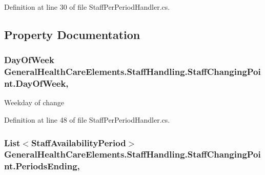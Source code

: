 Definition at line 30 of file Staff\+Per\+Period\+Handler.\+cs.



\subsection{Property Documentation}
\subsubsection[{\texorpdfstring{Day\+Of\+Week}{DayOfWeek}}]{\setlength{\rightskip}{0pt plus 5cm}Day\+Of\+Week General\+Health\+Care\+Elements.\+Staff\+Handling.\+Staff\+Changing\+Point.\+Day\+Of\+Week\hspace{0.3cm}{\ttfamily [get]}, {\ttfamily [set]}}\hypertarget{class_general_health_care_elements_1_1_staff_handling_1_1_staff_changing_point_a0a747e49188fd23d9830876bd79c09da}{}\label{class_general_health_care_elements_1_1_staff_handling_1_1_staff_changing_point_a0a747e49188fd23d9830876bd79c09da}


Weekday of change 



Definition at line 48 of file Staff\+Per\+Period\+Handler.\+cs.

\subsubsection[{\texorpdfstring{Periods\+Ending}{PeriodsEnding}}]{\setlength{\rightskip}{0pt plus 5cm}List$<${\bf Staff\+Availability\+Period}$>$ General\+Health\+Care\+Elements.\+Staff\+Handling.\+Staff\+Changing\+Point.\+Periods\+Ending\hspace{0.3cm}{\ttfamily [get]}, {\ttfamily [set]}}\hypertarget{class_general_health_care_elements_1_1_staff_handling_1_1_staff_changing_point_abc95ddf536eb91d042bf53b3d281485e}{}\label{class_general_health_care_elements_1_1_staff_handling_1_1_staff_changing_point_abc95ddf536eb91d042bf53b3d281485e}


